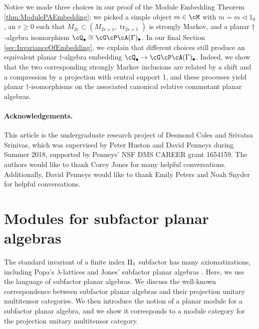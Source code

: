 \documentclass[11pt]{article}
\theoremstyle{plain}
\theoremstyle{definition}
\DeclareMathOperator{\tr}{tr}
\begin{document}
Notice we made three choices in our proof of the Module Embedding Theorem \ref{thm:ModulePAEmbedding}; we picked a simple object $m\in \cM$ with $m=m\vartriangleleft 1_0$, an $r\geq 0$ such that $M_{2r}\subset (M_{2r+1},\tr_{2r+1})$ is strongly Markov, and a planar $\dag$-algebra isomorphism $\cQ_\bullet \cong \cG\cP\cA(\Gamma)_\bullet$.
In our final Section \ref{sec:InvarianceOfEmbedding}, we explain that different choices still produce an equivalent planar $\dag$-algebra embedding $\cQ_\bullet \to \cG\cP\cA(\Gamma)_\bullet$.
Indeed, we show that the two corresponding strongly Markov inclusions are related by a shift and a compression by a projection with central support 1, and these processes yield planar $\dag$-isomorphisms on the associated canonical relative commutant planar algebras.

\paragraph{Acknowledgements.}

This article is the undergraduate research project of Desmond Coles and Srivatsa Srinivas, which was supervised by Peter Huston and David Penneys during Summer 2018, supported by Penneys' NSF DMS CAREER grant 1654159.
The authors would like to thank Corey Jones for many helpful conversations.
Additionally, David Penneys would like to thank Emily Peters and Noah Snyder for helpful conversations.


\section{Modules for subfactor planar algebras} 
\label{sec:Modules}

The standard invariant of a finite index ${\rm II}_1$ subfactor has many axiomatizations, including Popa's $\lambda$-lattices \cite{MR1334479} and Jones' subfactor planar algebras \cite{math.QA/9909027}.
Here, we use the language of subfactor planar algebras.
We discuss the well-known correspondence between subfactor planar algebras and their projection unitary multitensor categories.
We then introduce the notion of a planar module for a subfactor planar algebra, and we show it corresponds to a module category for the projection unitary multitensor category.
\end{document}
